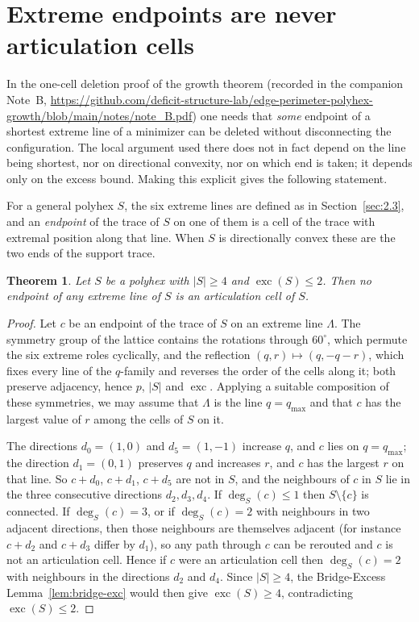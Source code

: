 \documentclass[11pt]{article}
\theoremstyle{plain}
\newtheorem{theorem}{Theorem}[section]
\theoremstyle{definition}
\theoremstyle{remark}
\newcommand{\sm}{\setminus}
\DeclareMathOperator{\exc}{exc}
\newcommand{\dg}{\operatorname{deg}}
\begin{document}
\section{Extreme endpoints are never articulation cells}\label{sec:15.4}

In the one-cell deletion proof of the growth theorem (recorded in the companion Note~B, \url{https://github.com/deficit-structure-lab/edge-perimeter-polyhex-growth/blob/main/notes/note_B.pdf}) one
needs that \emph{some} endpoint of a shortest extreme line of a minimizer can be deleted
without disconnecting the configuration. The local argument used there does not in fact
depend on the line being shortest, nor on directional convexity, nor on which end is taken;
it depends only on the excess bound. Making this explicit gives the following statement.

For a general polyhex \(S\), the six extreme lines are defined as in
Section~\ref{sec:2.3}, and an \emph{endpoint} of the trace of \(S\) on one of them is a
cell of the trace with extremal position along that line. When \(S\) is directionally
convex these are the two ends of the support trace.

\begin{theorem}\label{thm:endpoint}
Let \(S\) be a polyhex with \(|S|\ge4\) and \(\exc(S)\le2\). Then no endpoint of any extreme
line of \(S\) is an articulation cell of \(S\).
\end{theorem}

\begin{proof}
Let \(c\) be an endpoint of the trace of \(S\) on an extreme line \(\Lambda\). The symmetry
group of the lattice contains the rotations through \(60^{\circ}\), which permute the six
extreme roles cyclically, and the reflection \((q,r)\mapsto(q,-q-r)\), which fixes every
line of the \(q\)-family and reverses the order of the cells along it; both preserve
adjacency, hence \(p\), \(|S|\) and \(\exc\). Applying a suitable composition of these
symmetries, we may assume that \(\Lambda\) is the line \(q=q_{\max}\) and that \(c\) has
the largest value of \(r\) among the cells of \(S\) on it.

The directions \(d_{0}=(1,0)\) and \(d_{5}=(1,-1)\) increase \(q\), and \(c\) lies on
\(q=q_{\max}\); the direction \(d_{1}=(0,1)\) preserves \(q\) and increases \(r\), and
\(c\) has the largest \(r\) on that line. So \(c+d_{0}\), \(c+d_{1}\), \(c+d_{5}\) are not
in \(S\), and the neighbours of \(c\) in \(S\) lie in the three consecutive directions
\(d_{2},d_{3},d_{4}\). If \(\dg_{S}(c)\le1\) then \(S\sm\{c\}\) is connected. If
\(\dg_{S}(c)=3\), or if \(\dg_{S}(c)=2\) with neighbours in two adjacent directions, then
those neighbours are themselves adjacent (for instance \(c+d_{2}\) and \(c+d_{3}\) differ
by \(d_{1}\)), so any path through \(c\) can be rerouted and \(c\) is not an articulation
cell. Hence if \(c\) were an articulation cell then \(\dg_{S}(c)=2\) with neighbours in the
directions \(d_{2}\) and \(d_{4}\). Since \(|S|\ge4\), the Bridge-Excess
Lemma~\ref{lem:bridge-exc} would then give \(\exc(S)\ge4\), contradicting
\(\exc(S)\le2\).
\end{proof}
\end{document}
